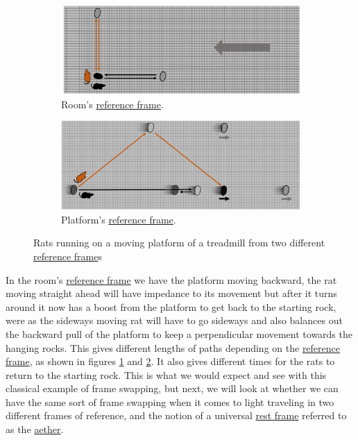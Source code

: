 \begin{figure}[H]
	\centering
	\begin{subfigure}{0.9\textwidth}
		\centering
		\includegraphics[width=\textwidth]{images/pdf/rats_moving.pdf}
		\caption{Room's \protect\hyperlink{def-Reference-frame}{reference frame}.}
		\label{fig: rat with moving platform}
	\end{subfigure}
	\begin{subfigure}{0.9\textwidth}
		\vspace{0.2cm}
		\centering
		\includegraphics[width=\textwidth]{images/pdf/rats_platform_frame.pdf}
		\caption{Platform's \protect\hyperlink{def-Reference-frame}{reference frame}.}
		\label{fig: rat platform reference frame}
	\end{subfigure}
	\caption{Rats running on a moving platform of a treadmill from two different \protect\hyperlink{def-Reference-frame}{reference frame}s}
	\label{fig: treadmill}
\end{figure}

In the room's \hyperlink{def-Reference-frame}{reference frame} we have the platform moving backward, the rat moving straight ahead will have impedance to its movement but after it turns around it now has a boost from the platform to get back to the starting rock, were as the sideways moving rat will have to go sideways and also balances out the backward pull of the platform to keep a perpendicular movement towards the hanging rocks. This gives different lengths of paths depending on the \hyperlink{def-Reference-frame}{reference frame}, as shown in figures \ref{fig: rat with moving platform} and \ref{fig: rat platform reference frame}. It also gives different times for the rats to return to the starting rock. This is what we would expect and see with this classical example of frame swapping, but next, we will look at whether we can have the same sort of frame swapping when it comes to light traveling in two different frames of reference, and the notion of a universal \hyperlink{def-proper-frame}{rest frame} referred to as the \hyperlink{def-aether}{aether}.

